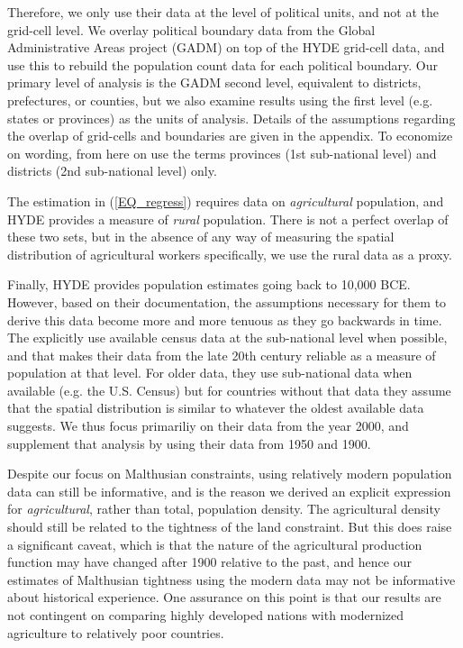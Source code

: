 \documentclass[11pt]{article}
\begin{document}
Therefore, we only use their data at the level of political units, and not at the grid-cell level. We overlay political boundary data from the Global Administrative Areas project (GADM) on top of the HYDE grid-cell data, and use this to rebuild the population count data for each political boundary. Our primary level of analysis is the GADM second level, equivalent to districts, prefectures, or counties, but we also examine results using the first level (e.g. states or provinces) as the units of analysis. Details of the assumptions regarding the overlap of grid-cells and boundaries are given in the appendix. To economize on wording, from here on use the terms provinces (1st sub-national level) and districts (2nd sub-national level) only.

The estimation in (\ref{EQ_regress}) requires data on \textit{agricultural} population, and HYDE provides a measure of \textit{rural} population. There is not a perfect overlap of these two sets, but in the absence of any way of measuring the spatial distribution of agricultural workers specifically, we use the rural data as a proxy.

Finally, HYDE provides population estimates going back to 10,000 BCE. However, based on their documentation, the assumptions necessary for them to derive this data become more and more tenuous as they go backwards in time. The explicitly use available census data at the sub-national level when possible, and that makes their data from the late 20th century reliable as a measure of population at that level. For older data, they use sub-national data when available (e.g. the U.S. Census) but for countries without that data they assume that the spatial distribution is similar to whatever the oldest available data suggests. We thus focus primariliy on their data from the year 2000, and supplement that analysis by using their data from 1950 and 1900.

Despite our focus on Malthusian constraints, using relatively modern population data can still be informative, and is the reason we derived an explicit expression for \textit{agricultural}, rather than total, population density. The agricultural density should still be related to the tightness of the land constraint. But this does raise a significant caveat, which is that the nature of the agricultural production function may have changed after 1900 relative to the past, and hence our estimates of Malthusian tightness using the modern data may not be informative about historical experience. One assurance on this point is that our results are not contingent on comparing highly developed nations with modernized agriculture to relatively poor countries. 
\end{document}
